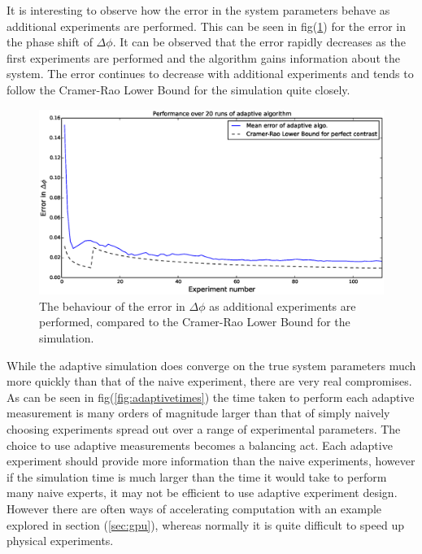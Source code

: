 It is interesting to observe how the error in the system parameters behave as additional experiments are performed. This can be seen in fig(\ref{fig:errexp}) for the error in the phase shift of $\Delta\phi$. It can be observed that the error rapidly decreases as the first experiments are performed and the algorithm gains information about the system. The error continues to decrease with additional experiments and tends to follow the Cramer-Rao Lower Bound for the simulation quite closely. 
 \begin{figure}[ht!]
\centering
\includegraphics[width=\textwidth]{Figures/meanerror.eps}
\caption{The behaviour of the error in $\Delta\phi$ as additional experiments are performed, compared to the Cramer-Rao Lower Bound for the simulation.}
\label{fig:errexp}
\end{figure}
While the adaptive simulation does converge on the true system parameters much more quickly than that of the naive experiment, there are very real compromises. As can be seen in fig(\ref{fig:adaptivetimes}) the time taken to perform each adaptive measurement is many orders of magnitude larger than that of simply naively choosing experiments spread out over a range of experimental parameters. The choice to use adaptive measurements becomes a balancing act. Each adaptive experiment should provide more information than the naive experiments, however if the simulation time is much larger than the time it would take to perform many naive experts, it may not be efficient to use adaptive experiment design. However there are often ways of accelerating computation with an example explored in section (\ref{sec:gpu}), whereas normally it is quite difficult to speed up physical experiments.  

